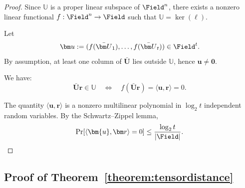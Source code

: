 \begin{proof}
Since $\mathbb U$ is a proper linear subspace of $\Field^n$,
there exists a nonzero linear functional
$f: \Field^n \to \Field$ such that
$\mathbb U = \ker(\ell)$.

Let
\[
\bm u := (f(\bar{\bm U}_1), \ldots, f(\bar{\bm U}_t)) \in \Field^t.
\]
By assumption, at least one column of $\bar{\bm U}$ lies outside $\mathbb U$,
hence $\bm u \neq \bm 0$.

We have:
\[
\bar{\bm U}\bm r \in \mathbb U
\quad\Longleftrightarrow\quad
f(\bar{\bm U}\bm r) = \langle \bm{u}, \bm r \rangle = 0.
\]

The quantity $\langle \bm{u}, \bm r \rangle$ is a nonzero multilinear polynomial
in $\log_2 t$ independent random variables.
By the Schwartz--Zippel lemma,
\[
\Pr[\langle \bm{u}, \bm r \rangle = 0] \le \frac{\log_2 t}{|\Field|}.
\qedhere
\]
\end{proof}
\fi


\subsection{Proof of Theorem~\ref{theorem:tensordistance}}
\label{appx:prooftensordistance}

